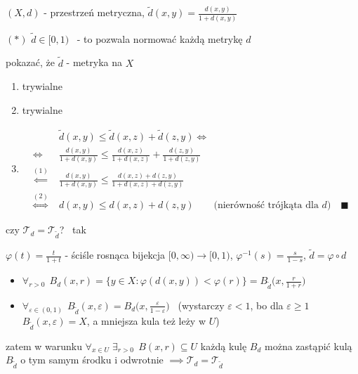 \documentclass[a4paper,12pt]{article}
\begin{document}
\newpage
{}

\bigskip
{} \; \((X, d)\) - przestrzeń metryczna, \; \(\tilde{d}(x, y) = \frac{d(x, y)}{1 + d(x, y)}\)

\smallskip
\((*)\) \; \(\tilde{d} \in [0, 1)\) \, - to pozwala normować każdą metrykę \(d\)
\begin{podpunkty}
    \item pokazać, że \(\tilde{d}\) - metryka na \(X\)
    \begin{enumerate}[label=\roman*), leftmargin=1.9em, itemsep=0.2em, topsep=0.2em, parsep=0pt, partopsep=0pt]
        \item trywialne
        \item trywialne
        \item
        \begin{align*}
        & \tilde{d}(x, y) \leq \tilde{d}(x, z) + \tilde{d}(z, y) \iff \\
        \iff \; & \frac{d(x, y)}{1 + d(x, y)} \leq \frac{d(x, z)}{1 + d(x, z)} + \frac{d(z, y)}{1 + d(z, y)} \\
        \overset{(1)}{\impliedby} \; & \frac{d(x, y)}{1 + d(x, y)} \leq \frac{d(x, z) + d(z, y)}{1 + d(x, z) + d(z, y)} \\
        \overset{(2)}{\iff} \; & d(x, y) \leq d(x, z) + d(z, y) \qquad \text{(nierówność trójkąta dla } d\text{)} \quad \blacksquare
        \end{align*}
    \end{enumerate}
    \item czy \(\mathcal{T}_d = \mathcal{T}_{\tilde{d}}\)? \, tak

    \smallskip
    \(\varphi(t) = \frac{t}{1 + t}\) - ściśle rosnąca bijekcja \([0, \infty) \to [0, 1)\), \; \(\varphi^{-1}(s) = \frac{s}{1 - s}\), \; \(\tilde{d} = \varphi \circ d\)
    \begin{itemize}
        \item \(\forall_{r > 0} \;\, B_d(x, r) = \{y \in X : \varphi(d(x, y)) < \varphi(r)\} = B_{\tilde{d}}\big(x, \frac{r}{1 + r}\big)\)
        \item \(\forall_{\varepsilon \in (0, 1)} \;\, B_{\tilde{d}}(x, \varepsilon) = B_d\big(x, \frac{\varepsilon}{1 - \varepsilon}\big)\) \, (wystarczy \(\varepsilon < 1\), bo dla \(\varepsilon \geq 1\) \; \(B_{\tilde{d}}(x, \varepsilon) = X\), a mniejsza kula też leży w \(U\))
    \end{itemize}
    zatem w warunku \(\forall_{x \in U} \; \exists_{r > 0} \;\, B(x, r) \subseteq U\) każdą kulę \(B_d\) można zastąpić kulą \(B_{\tilde{d}}\) o tym samym środku i odwrotnie \(\implies \mathcal{T}_d = \mathcal{T}_{\tilde{d}}\)
\end{podpunkty}
\end{document}
